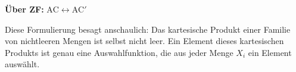 \begin{math-stroke}

\textbf{Über ZF:} $\text{AC} \leftrightarrow \text{AC}'$

\begin{explanation-of-steps}
Diese Formulierung besagt anschaulich: Das kartesische Produkt einer Familie von nichtleeren Mengen ist selbst nicht leer. Ein Element dieses kartesischen Produkts ist genau eine Auswahlfunktion, die aus jeder Menge $X_i$ ein Element auswählt.
\end{explanation-of-steps}
\end{math-stroke}


